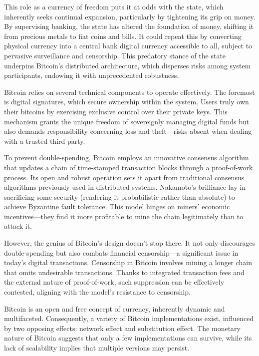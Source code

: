 \documentclass[
  a5paper,
  smalldemyvopaper,10pt,twoside,onecolumn,openright,extrafontsizes,hidelinks]{memoir}
\begin{document}
This role as a currency of freedom puts it at odds with the state, which
inherently seeks continual expansion, particularly by tightening its
grip on money. By supervising banking, the state has altered the
foundation of money, shifting it from precious metals to fiat coins and
bills. It could repeat this by converting physical currency into a
central bank digital currency accessible to all, subject to pervasive
surveillance and censorship. This predatory stance of the state
underpins Bitcoin's distributed architecture, which disperses risks
among system participants, endowing it with unprecedented robustness.

Bitcoin relies on several technical components to operate effectively.
The foremost is digital signatures, which secure ownership within the
system. Users truly own their bitcoins by exercising exclusive control
over their private keys. This mechanism grants the unique freedom of
sovereignly managing digital funds but also demands responsibility
concerning loss and theft---risks absent when dealing with a trusted
third party.

To prevent double-spending, Bitcoin employs an innovative consensus
algorithm that updates a chain of time-stamped transaction blocks
through a proof-of-work process. Its open and robust operation sets it
apart from traditional consensus algorithms previously used in
distributed systems. Nakamoto's brilliance lay in sacrificing some
security (rendering it probabilistic rather than absolute) to achieve
Byzantine fault tolerance. This model hinges on miners' economic
incentives---they find it more profitable to mine the chain legitimately
than to attack it.

However, the genius of Bitcoin's design doesn't stop there. It not only
discourages double-spending but also combats financial censorship---a
significant issue in today's digital transactions. Censorship in Bitcoin
involves mining a longer chain that omits undesirable transactions.
Thanks to integrated transaction fees and the external nature of
proof-of-work, such suppression can be effectively contested, aligning
with the model's resistance to censorship.

Bitcoin is an open and free concept of currency, inherently dynamic and
multifaceted. Consequently, a variety of Bitcoin implementations exist,
influenced by two opposing effects: network effect and substitution
effect. The monetary nature of Bitcoin suggests that only a few
implementations can survive, while its lack of scalability implies that
multiple versions may persist.
\end{document}
